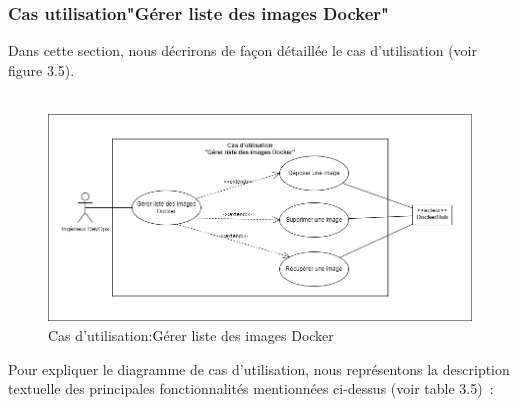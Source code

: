       \subsubsection{\Large Cas utilisation"Gérer liste des images Docker"}
      \textsf{\selectfont{} 
      Dans cette section, nous décrirons de façon détaillée le cas d'utilisation (voir figure 3.5).\\\texttt{}\\[0.01cm]
      }
      \begin{figure}[H]
        \begin{center}
        
            \includegraphics[width=15cm]{usecase5.drawio.png}
      
        \end{center}
        
        \caption{Cas d'utilisation:Gérer liste des images Docker}
      \end{figure}
      \textsf{\selectfont{}
      Pour expliquer  le diagramme de cas d’utilisation, nous représentons la description textuelle des principales fonctionnalités mentionnées ci-dessus (voir table 3.5) : \\}
